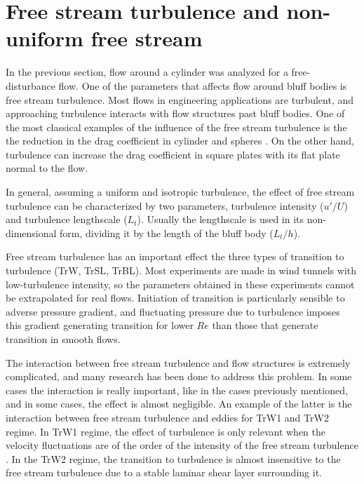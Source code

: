\documentclass[journal]{new-aiaa}
\begin{document}
\section{Free stream turbulence and non-uniform free stream}

In the previous section, flow around a cylinder was analyzed for a free-disturbance flow. One of the parameters that affects flow around bluff bodies is free stream turbulence. Most flows in engineering applications are turbulent, and approaching turbulence interacts with flow structures past bluff bodies. One of the most classical examples of the influence of the free stream turbulence is the the reduction in the drag coefficient in cylinder and spheres \cite{Nakamura1988}. On the other hand, turbulence can increase the drag coefficient in square plates with its flat plate normal to the flow. 

In general, assuming a uniform and isotropic turbulence, the effect of free stream turbulence can be characterized by two parameters, turbulence intensity ($u'/U$) and turbulence lengthscale ($L_t$). Usually the lengthscale is used in its non-dimensional form, dividing it by the length of the bluff body ($L_t/h$).     

Free stream turbulence has an important effect the three types of transition to turbulence (TrW, TrSL, TrBL). Most experiments are made in wind tunnels with low-turbulence intensity, so the parameters obtained in these experiments cannot be extrapolated for real flows. Initiation of transition is particularly sensible to adverse pressure gradient, and fluctuating pressure due to turbulence imposes this gradient generating transition for lower $Re$ than those that generate transition in smooth flows.  

The interaction between free stream turbulence and flow structures is extremely complicated, and many research has been done to address this problem. In some cases the interaction is really important, like in the cases previously mentioned, and in some cases, the effect is almost negligible. An example of the latter is the interaction between free stream turbulence and eddies for TrW1 and TrW2 regime. In TrW1 regime, the effect of turbulence is only relevant when the velocity fluctuations are of the order of the intensity of the free stream turbulence \citep{Zdravkovich1997}. In the TrW2 regime, the transition to turbulence is almost insensitive to the free stream turbulence due to a stable laminar shear layer surrounding it.
\end{document}
